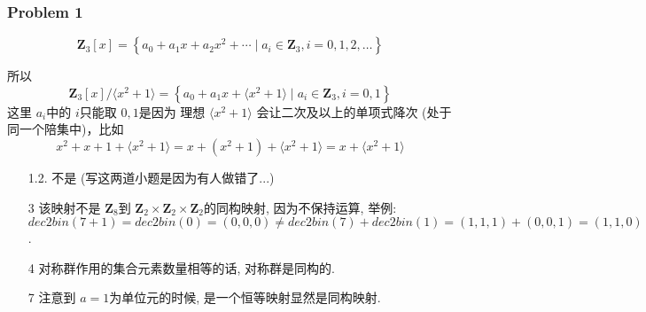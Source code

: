 \documentclass[a4paper,12pt]{ctexart}
\newcommand{\Z}{\mathbf{Z}}
\begin{document}
      

\subsubsection*{Problem 1}


        \[\Z_3[x]=\left\{ a_0+a_1x+a_2x^2+\cdots \mid a_i\in\Z_3,i=0,1,2,\dots \right\}\]

        所以 
        \[\Z_3[x]/\langle x^2+1\rangle = \left\{ a_0+a_1x+\langle x^2+1\rangle\mid a_i\in\Z_3,i=0,1 \right\}\]
        这里 $ a_i $中的 $ i $只能取 $ 0,1 $是因为 理想 $ \langle x^2+1\rangle $ 会让二次及以上的单项式降次 (处于同一个陪集中)，比如
        \[x^2+x+1+\langle x^2+1\rangle=x+(x^2+1)+\langle x^2+1\rangle=x+\langle x^2+1\rangle\]


      \begin{enumerate}
        \item[1.2.] 不是 (写这两道小题是因为有人做错了...)
        \item[3]  该映射不是 $ \Z_8 $到 $ \Z_2\times\Z_2\times\Z_2 $的同构映射, 
        因为不保持运算, 举例: $ dec2bin(7+1)=dec2bin(0)=(0,0,0)\neq dec2bin(7)+dec2bin(1)=(1,1,1)+(0,0,1)=(1,1,0) $.
        \item[4] 对称群作用的集合元素数量相等的话, 对称群是同构的.
        \item[7] 注意到 $ a=1 $为单位元的时候, 是一个恒等映射显然是同构映射.    
      \end{enumerate}
\end{document}
